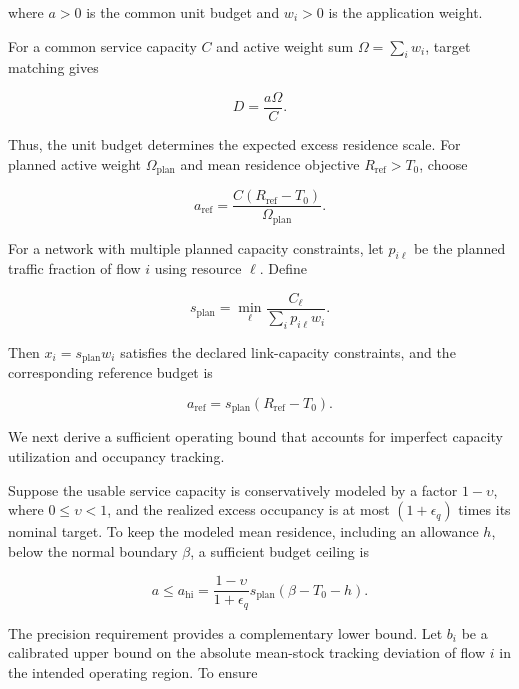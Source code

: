 where \(a>0\) is the common unit budget and \(w_i>0\) is the application weight.

For a common service capacity \(C\) and active weight sum \(\Omega=\sum_iw_i\), target matching gives

\begin{equation}
\label{eq:app-e-23}
D=\frac{a\Omega}{C}.
\end{equation}

Thus, the unit budget determines the expected excess residence scale. For planned active weight \(\Omega_{\mathrm{plan}}\) and mean residence objective \(R_{\mathrm{ref}}>T_0\), choose

\begin{equation}
\label{eq:app-e-24}
a_{\mathrm{ref}}
=
\frac{C(R_{\mathrm{ref}}-T_0)}
{\Omega_{\mathrm{plan}}}.
\end{equation}

For a network with multiple planned capacity constraints, let \(p_{i\ell}\) be the planned traffic fraction of flow \(i\) using resource \(\ell\). Define

\begin{equation}
\label{eq:app-e-25}
s_{\mathrm{plan}}
=
\min_\ell
\frac{C_\ell}{\sum_i p_{i\ell}w_i}.
\end{equation}

Then \(x_i=s_{\mathrm{plan}}w_i\) satisfies the declared link-capacity constraints, and the corresponding reference budget is

\begin{equation}
\label{eq:app-e-26}
a_{\mathrm{ref}}
=
s_{\mathrm{plan}}(R_{\mathrm{ref}}-T_0).
\end{equation}

We next derive a sufficient operating bound that accounts for imperfect capacity utilization and occupancy tracking.

Suppose the usable service capacity is conservatively modeled by a factor \(1-\upsilon\), where \(0\le\upsilon<1\), and the realized excess occupancy is at most \((1+\epsilon_q)\) times its nominal target. To keep the modeled mean residence, including an allowance \(h\), below the normal boundary \(\beta\), a sufficient budget ceiling is

\begin{equation}
\label{eq:app-e-27}
\boxed{
a\le a_{\mathrm{hi}}
=
\frac{1-\upsilon}{1+\epsilon_q}
s_{\mathrm{plan}}(\beta-T_0-h).
}
\end{equation}

The precision requirement provides a complementary lower bound. Let \(b_i\) be a calibrated upper bound on the absolute mean-stock tracking deviation of flow \(i\) in the intended operating region. To ensure

